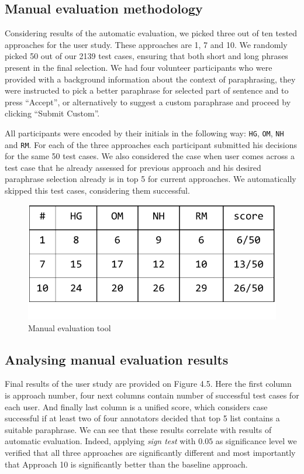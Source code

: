 \subsection{Manual evaluation methodology}

Considering results of the automatic evaluation, we picked three out of ten tested approaches for the user study. These approaches are 1, 7 and 10. We randomly picked 50 out of our 2139 test cases, ensuring that both short and long phrases present in the final selection. We had four volunteer participants who were provided with a background information about the context of paraphrasing, they were instructed to pick a better paraphrase for selected part of sentence and to press ``Accept'', or alternatively to suggest a custom paraphrase and proceed by clicking ``Submit Custom''. 

All participants were encoded by their initials in the following way: \texttt{HG}, \texttt{OM}, \texttt{NH} and \texttt{RM}. For each of the three approaches each participant submitted his decisions for the same 50 test cases. We also considered the case when user comes across a test case that he already assessed for previous approach and his desired paraphrase selection already is in top 5 for current approaches. We automatically skipped this test cases, considering them successful. 

\begin{figure}
 \centering 
 \includegraphics[scale=0.8]{g/man-eval-result.pdf}
 \caption{Manual evaluation tool}
\end{figure}

\subsection{Analysing manual evaluation results}

Final results of the user study are provided on Figure 4.5. Here the first column is approach number, four next columns contain number of successful test cases for each user. And finally last column is a unified score, which considers case successful if at least two of four annotators decided that top 5 list contains a suitable paraphrase. We can see that these results correlate with results of automatic evaluation. Indeed, applying \emph{sign test} with $0.05$ as significance level we verified that all three approaches are significantly different and most importantly that Approach 10 is significantly better than the baseline approach.